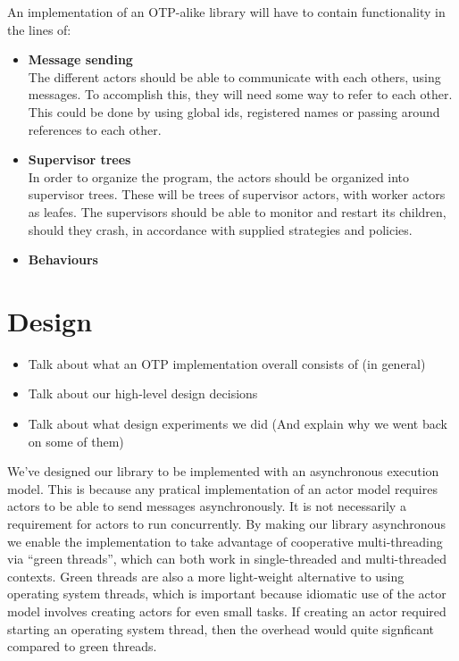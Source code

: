 \documentclass[a4paper]{article}
\begin{document}
An implementation of an OTP-alike library will have to contain functionality in the lines of:
\begin{itemize}
\item \textbf{Message sending}\\
  The different actors should be able to communicate with each others, using
  messages. To accomplish this, they will need some way to refer to each other.
  This could be done by using global ids, registered names or passing around
  references to each other.
\item \textbf{Supervisor trees}\\
  In order to organize the program, the actors should be organized into
  supervisor trees. These will be trees of supervisor actors, with worker actors
  as leafes. The supervisors should be able to monitor and restart its children,
  should they crash, in accordance with supplied strategies and policies.
\item \textbf{Behaviours}
\end{itemize}


\section{Design}
\begin{itemize}
\item Talk about what an OTP implementation overall consists of (in general)
\item Talk about our high-level design decisions
\item Talk about what design experiments we did (And explain why we went back on
  some of them)
\end{itemize}

We've designed our library to be implemented with an asynchronous execution model.
This is because any pratical implementation of an actor model requires actors to
be able to send messages asynchronously. It is not necessarily a requirement for
actors to run concurrently. By making our library asynchronous we enable the
implementation to take advantage of cooperative multi-threading via
``green threads'', which can both work in single-threaded and multi-threaded
contexts. Green threads are also a more light-weight alternative to using
operating system threads, which is important because idiomatic use of the actor
model involves creating actors for even small tasks. If creating an actor
required starting an operating system thread, then the overhead would quite
signficant compared to green threads.
\end{document}
